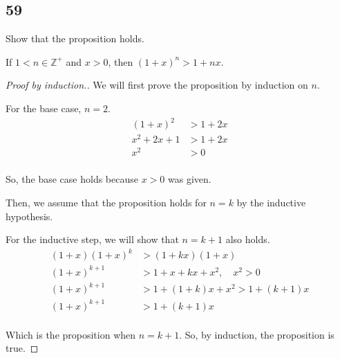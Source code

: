 \documentclass[../hw4.texz]{subfiles}
\begin{document}
\subsection*{59}
Show that the proposition holds.

\begin{proposition}
    If $1 < n \in \mathbb{Z}^+$ and $x>0$, then ${(1+x)}^n>1+nx$.
\end{proposition}

\begin{proof}[Proof by induction.]
    We will first prove the proposition by induction on $n$.

    For the base case, $n = 2$.
    \begin{align*}
        {(1+x)}^2 &> 1+2x \\
        x^2+2x+1 &> 1+2x \\
        x^2 &> 0 \\
    \end{align*}

    So, the base case holds because $x>0$ was given.

    Then, we assume that the proposition holds for $n=k$ by the inductive hypothesis.

    For the inductive step, we will show that $n=k+1$ also holds.
    \begin{align*}
        (1+x){(1+x)}^k &> (1+kx)(1+x) \\
        {(1+x)}^{k+1} &> 1+x+kx+x^2, \quad {x^2>0} \\
        {(1+x)}^{k+1} &> 1+(1+k)x+x^2 > 1+(k+1)x \\
        {(1+x)}^{k+1} &> 1+(k+1)x \\
    \end{align*}

    Which is the proposition when $n=k+1$. So, by induction, the proposition is true.
\end{proof}
\end{document}
